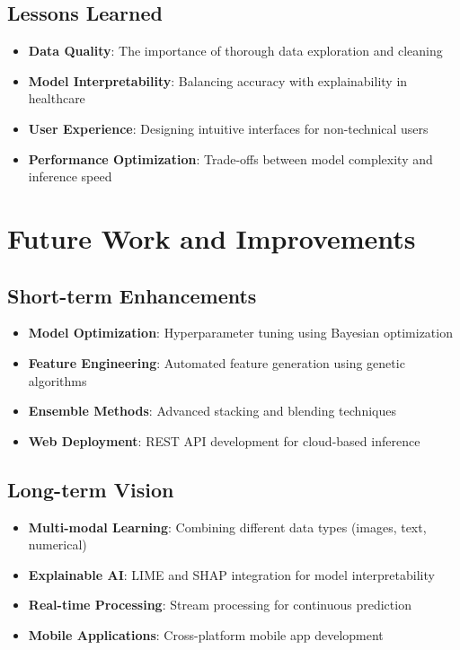 \documentclass[12pt, a4paper]{article}
\begin{document}
\subsection{Lessons Learned}
\begin{itemize}
    \item \textbf{Data Quality}: The importance of thorough data exploration and cleaning
    \item \textbf{Model Interpretability}: Balancing accuracy with explainability in healthcare
    \item \textbf{User Experience}: Designing intuitive interfaces for non-technical users
    \item \textbf{Performance Optimization}: Trade-offs between model complexity and inference speed
\end{itemize}

\section{Future Work and Improvements}

\subsection{Short-term Enhancements}
\begin{itemize}
    \item \textbf{Model Optimization}: Hyperparameter tuning using Bayesian optimization
    \item \textbf{Feature Engineering}: Automated feature generation using genetic algorithms
    \item \textbf{Ensemble Methods}: Advanced stacking and blending techniques
    \item \textbf{Web Deployment}: REST API development for cloud-based inference
\end{itemize}

\subsection{Long-term Vision}
\begin{itemize}
    \item \textbf{Multi-modal Learning}: Combining different data types (images, text, numerical)
    \item \textbf{Explainable AI}: LIME and SHAP integration for model interpretability
    \item \textbf{Real-time Processing}: Stream processing for continuous prediction
    \item \textbf{Mobile Applications}: Cross-platform mobile app development
\end{itemize}
\end{document}
